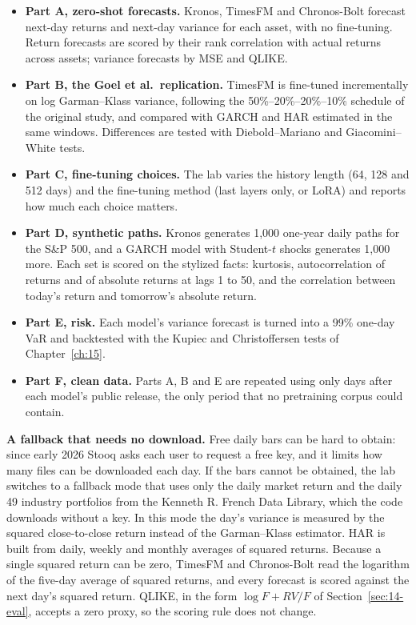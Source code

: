 \begin{itemize}
  \item \textbf{Part A, zero-shot forecasts.} Kronos, TimesFM and Chronos-Bolt forecast next-day returns and next-day variance for each asset, with no fine-tuning. Return forecasts are scored by their rank correlation with actual returns across assets; variance forecasts by MSE and QLIKE.
  \item \textbf{Part B, the Goel et al.\ replication.} TimesFM is fine-tuned incrementally on log Garman--Klass variance, following the 50\%--20\%--20\%--10\% schedule of the original study, and compared with GARCH and HAR estimated in the same windows. Differences are tested with Diebold--Mariano and Giacomini--White tests.
  \item \textbf{Part C, fine-tuning choices.} The lab varies the history length (64, 128 and 512 days) and the fine-tuning method (last layers only, or LoRA) and reports how much each choice matters.
  \item \textbf{Part D, synthetic paths.} Kronos generates 1,000 one-year daily paths for the S\&P 500, and a GARCH model with Student-$t$ shocks generates 1,000 more. Each set is scored on the stylized facts: kurtosis, autocorrelation of returns and of absolute returns at lags 1 to 50, and the correlation between today's return and tomorrow's absolute return.
  \item \textbf{Part E, risk.} Each model's variance forecast is turned into a 99\% one-day VaR and backtested with the Kupiec and Christoffersen tests of Chapter~\ref{ch:15}.
  \item \textbf{Part F, clean data.} Parts A, B and E are repeated using only days after each model's public release, the only period that no pretraining corpus could contain.
\end{itemize}

\textbf{A fallback that needs no download.} Free daily bars can be hard to obtain: since early 2026 Stooq asks each user to request a free key, and it limits how many files can be downloaded each day. If the bars cannot be obtained, the lab switches to a fallback mode that uses only the daily market return and the daily 49 industry portfolios from the Kenneth R. French Data Library, which the code downloads without a key. In this mode the day's variance is measured by the squared close-to-close return instead of the Garman--Klass estimator. HAR is built from daily, weekly and monthly averages of squared returns. Because a single squared return can be zero, TimesFM and Chronos-Bolt read the logarithm of the five-day average of squared returns, and every forecast is scored against the next day's squared return. QLIKE, in the form $\log F + RV/F$ of Section~\ref{sec:14-eval}, accepts a zero proxy, so the scoring rule does not change.

